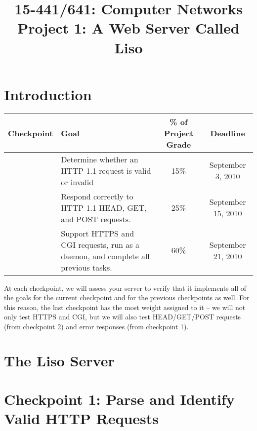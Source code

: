 \documentclass{article}
\begin{document}
\title{	15-441/641: Computer Networks\\
Project 1: A Web Server Called Liso\\
}
\date{}

\maketitle

\section{Introduction}


\begin{center}
\vspace{10pt}
\begin{tabular}{cp{2.25in}cc}
  Checkpoint&Goal&\% of Project Grade&Deadline\\
  \hline
  
  \addlinespace[5pt]
  1&Determine whether an HTTP 1.1 request is valid or invalid&15\%&September 3, 2010\\
  
  \addlinespace[5pt]
  2&Respond correctly to HTTP 1.1 HEAD, GET, and POST requests.&25\%&September 15, 2010\\
  
  \addlinespace[5pt]
  3&Support HTTPS and CGI requests, run as a daemon, and complete all previous tasks.&60\%&September 21, 2010\\
\end{tabular}
\end{center}

\noindent At each checkpoint, we will assess your server to verify that it implements all of the goals for the current checkpoint and for the previous checkpoints as well. 
  For this reason, the last checkpoint has the most weight assigned to it -- we will not only test HTTPS and CGI, but we will also test HEAD/GET/POST requests (from checkpoint 2) and error responses (from checkpoint 1).

\newpage
\section{The Liso Server}


\newpage
\section{Checkpoint 1: Parse and Identify Valid HTTP Requests}

\end{document}
